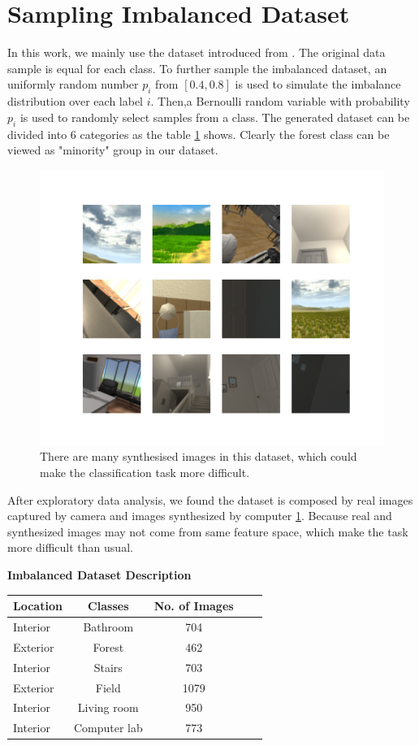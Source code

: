\documentclass[10pt,twocolumn,letterpaper]{article}
\begin{document}
\section{Sampling Imbalanced Dataset}
In this work, we mainly use the dataset introduced from \cite{inproceedings}. The original data sample is equal for each class. To further sample the imbalanced dataset, an uniformly random number $p_i$ from $\left [ 0.4, 0.8 \right ]$ is used to simulate the imbalance distribution over each label $i$. Then,a Bernoulli random variable with probability $p_i$ is used to randomly select samples from a class. The generated dataset can be divided into 6 categories as the table \ref{dataset} shows. Clearly the forest class can be viewed as "minority" group in our dataset.
\begin{figure}
    \centering
    \includegraphics[scale = 0.55]{ProgressReport/eda-2.pdf}
    \caption{There are many synthesised images in this dataset, which could make the classification task more difficult.}
    \label{eda}
\end{figure}
After exploratory data analysis, we found the dataset is composed by real images captured by camera and images synthesized by computer \ref{eda}. Because real and synthesized images may not come from same feature space, which make the task more difficult than usual.

\begin{table}
\begin{center}
\textbf{Imbalanced Dataset Description}
\label{dataset}
\begin{tabular}{lcccc}
\hline Location & Classes & No. of Images \\
\hline
Interior & Bathroom & 704 \\
Exterior & Forest & 462 \\
Interior & Stairs & 703 \\
Exterior & Field & 1079 \\
Interior & Living room & 950 \\
Interior & Computer lab & 773 \\
\hline
\end{tabular}
\end{center}
\end{table}
\end{document}
